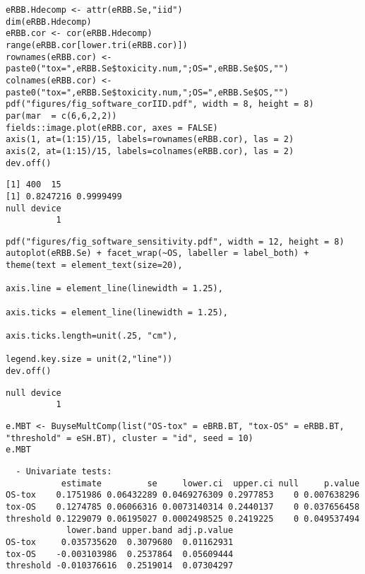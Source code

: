 \documentclass[12pt]{article}
\begin{document}
\lstset{language=r,label= ,caption= ,captionpos=b,numbers=none}
\begin{lstlisting}
eRBB.Hdecomp <- attr(eRBB.Se,"iid")
dim(eRBB.Hdecomp)
eRBB.cor <- cor(eRBB.Hdecomp)
range(eRBB.cor[lower.tri(eRBB.cor)])
rownames(eRBB.cor) <- paste0("tox=",eRBB.Se$toxicity.num,";OS=",eRBB.Se$OS,"")
colnames(eRBB.cor) <- paste0("tox=",eRBB.Se$toxicity.num,";OS=",eRBB.Se$OS,"")
pdf("figures/fig_software_corIID.pdf", width = 8, height = 8)
par(mar  = c(6,6,2,2))
fields::image.plot(eRBB.cor, axes = FALSE)
axis(1, at=(1:15)/15, labels=rownames(eRBB.cor), las = 2)
axis(2, at=(1:15)/15, labels=colnames(eRBB.cor), las = 2)
dev.off()
\end{lstlisting}

\begin{verbatim}
[1] 400  15
[1] 0.8247216 0.9999499
null device 
          1
\end{verbatim}


\lstset{language=r,label= ,caption= ,captionpos=b,numbers=none}
\begin{lstlisting}
pdf("figures/fig_software_sensitivity.pdf", width = 12, height = 8)
autoplot(eRBB.Se) + facet_wrap(~OS, labeller = label_both) + theme(text = element_text(size=20), 
                                                                   axis.line = element_line(linewidth = 1.25),
                                                                   axis.ticks = element_line(linewidth = 1.25),
                                                                   axis.ticks.length=unit(.25, "cm"),
                                                                   legend.key.size = unit(2,"line"))
dev.off()
\end{lstlisting}

\begin{verbatim}
null device 
          1
\end{verbatim}



\lstset{language=r,label= ,caption= ,captionpos=b,numbers=none}
\begin{lstlisting}
e.MBT <- BuyseMultComp(list("OS-tox" = eBRB.BT, "tox-OS" = eRBB.BT, "threshold" = eSH.BT), cluster = "id", seed = 10)
e.MBT
\end{lstlisting}

\begin{verbatim}
  - Univariate tests:
           estimate         se     lower.ci  upper.ci null     p.value
OS-tox    0.1751986 0.06432289 0.0469276309 0.2977853    0 0.007638296
tox-OS    0.1274785 0.06066316 0.0073140314 0.2440137    0 0.037656458
threshold 0.1229079 0.06195027 0.0002498525 0.2419225    0 0.049537494
            lower.band upper.band adj.p.value
OS-tox     0.035735620  0.3079680  0.01162931
tox-OS    -0.003103986  0.2537864  0.05609444
threshold -0.010376616  0.2519014  0.07304297
\end{verbatim}
\end{document}
